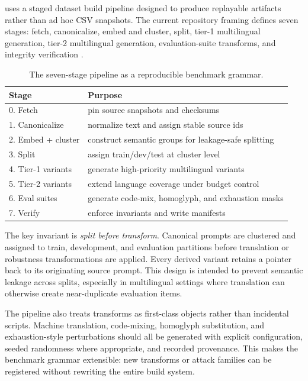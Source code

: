 \system uses a staged dataset build pipeline designed to produce replayable artifacts rather than ad hoc CSV snapshots. The current repository framing defines seven stages: fetch, canonicalize, embed and cluster, split, tier-1 multilingual generation, tier-2 multilingual generation, evaluation-suite transforms, and integrity verification \citep{shibbolethdraft2026}.

\begin{table}[t]
\centering
\small
\begin{tabular}{ll}
\toprule
Stage & Purpose \\
\midrule
0. Fetch & pin source snapshots and checksums \\
1. Canonicalize & normalize text and assign stable source ids \\
2. Embed + cluster & construct semantic groups for leakage-safe splitting \\
3. Split & assign train/dev/test at cluster level \\
4. Tier-1 variants & generate high-priority multilingual variants \\
5. Tier-2 variants & extend language coverage under budget control \\
6. Eval suites & generate code-mix, homoglyph, and exhaustion masks \\
7. Verify & enforce invariants and write manifests \\
\bottomrule
\end{tabular}
\caption{The seven-stage \system pipeline as a reproducible benchmark grammar.}
\end{table}

The key invariant is \emph{split before transform}. Canonical prompts are clustered and assigned to train, development, and evaluation partitions before translation or robustness transformations are applied. Every derived variant retains a pointer back to its originating source prompt. This design is intended to prevent semantic leakage across splits, especially in multilingual settings where translation can otherwise create near-duplicate evaluation items.

The pipeline also treats transforms as first-class objects rather than incidental scripts. Machine translation, code-mixing, homoglyph substitution, and exhaustion-style perturbations should all be generated with explicit configuration, seeded randomness where appropriate, and recorded provenance. This makes the benchmark grammar extensible: new transforms or attack families can be registered without rewriting the entire build system.

